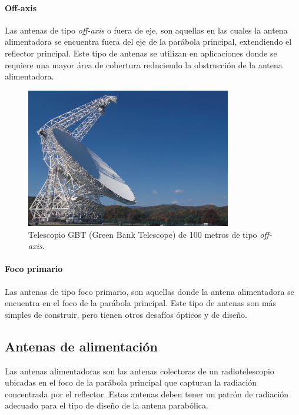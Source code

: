 \paragraph{Off-axis}

Las antenas de tipo \textit{off-axis} o fuera de eje, son aquellas en las cuales la antena alimentadora se encuentra fuera del eje de la parábola principal, extendiendo el reflector principal. Este tipo de antenas se utilizan en aplicaciones donde se requiere una mayor área de cobertura reduciendo la obstrucción de la antena alimentadora.

\begin{figure}
    \centering
    \includegraphics[width = 0.8\textwidth]{img/off-axis.jpg}
    \caption{Telescopio GBT (Green Bank Telescope) de 100 metros de tipo \textit{off-axis}.}
    \label{fig:off}
\end{figure}


\paragraph{Foco primario}

Las antenas de tipo foco primario, son aquellas donde la antena alimentadora se encuentra en el foco de la parábola principal. Este tipo de antenas son más simples de construir, pero tienen otros desafíos ópticos y de diseño.\\

\subsection{Antenas de alimentación}

Las antenas alimentadoras son las antenas colectoras de un radiotelescopio ubicadas en el foco de la parábola principal que capturan la radiación concentrada por el reflector. Estas antenas deben tener un patrón de radiación adecuado para el tipo de diseño de la antena parabólica.\\

